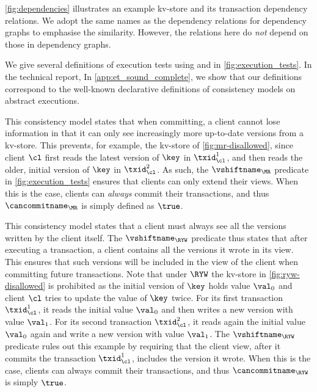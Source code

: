 \noindent \cref{fig:dependencies} illustrates an example kv-store and
its transaction dependency relations.
We adopt the same names as the dependency relations for dependency graphs \citep{adya}
to emphasise the similarity.
However, the relations here do \emph{not} depend on those in dependency graphs.

We give several definitions of
execution tests using \vshiftname and \cancommitname in \cref{fig:execution_tests}. 
\ifTechRepEdits%
In the technical report,
\else%
In \cref{app:et_sound_complete},
\fi
we show that our definitions correspond to
the well-known declarative definitions of consistency models on abstract executions.


This consistency model states that when committing, a client
cannot lose information in that it can only see increasingly more up-to-date versions from a kv-store.
This prevents, for example, the kv-store of \cref{fig:mr-disallowed},
since client \(\cl\) first reads the latest version of \(\key\) in \(\txid_{\cl}^{1}\), 
and then reads the older, initial version of \(\key\) in \(\txid_{\cl}^{2}\).  
As such, the \(\vshiftname_{\MR}\) predicate in \cref{fig:execution_tests} ensures that clients  can only extend their views. 
When this is the case, clients can \emph{always} commit their transactions, and thus \(\cancommitname_{\MR}\) is simply defined as \(\true\). 

This consistency model states that a client must always see all the versions written by the client itself. 
The \(\vshiftname_{\RYW}\) predicate thus states that after executing a transaction, a client 
contains all the versions it wrote in its view. This ensures that such versions will be included in the view of the client 
when committing future transactions.
Note that under \(\RYW\) the kv-store in \cref{fig:ryw-disallowed} is prohibited as
the initial version of \(\key\) holds value \(\val_0\) 
and client \(\cl\) tries to update the value of \(\key\) twice.  
For its first transaction \( \txid_{\cl}^1\), it reads the initial value \(\val_0\) and then writes a new version with value \(\val_1\). 
For its second transaction \( \txid_{\cl}^2\), it reads again the initial value \(\val_0\) again and write a new version with value \(\val_1\).
The \(\vshiftname_{\RYW}\) predicate rules out this example by requiring that
the client view, after it commits the transaction  \(\txid_{\cl}^{1}\), includes the version it wrote.  
When this is the case, clients can always commit their transactions, and thus \(\cancommitname_{\RYW}\) is simply \(\true\).

